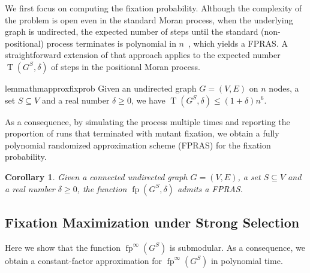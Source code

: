 \documentclass[letterpaper]{article}
\newtheorem{corollary}{Corollary}
\newcommand{\X}{\mathsf{X}}
\newcommand{\fp}{\operatorname{fp}}
\newcommand{\ft}{\operatorname{T}}
\newcommand{\FitAdv}{\delta}
\begin{document}
We first focus on computing the fixation probability.
Although the complexity of the problem is open even in the standard Moran process,
when the underlying graph is undirected, the expected number of steps until
the standard (non-positional) process terminates %
is polynomial in $n$~\cite{Diaz2014}, which yields a FPRAS.
A straightforward extension of that approach applies to the expected number $\ft(G^S,\FitAdv)$ of steps in the positional Moran process.
\begin{restatable}{lemma}{thmapproxfixprob}\label{thm:approx_fix_prob}
Given an undirected graph $G=(V,E)$ on $n$ nodes,
a set $S\subseteq V$ and a real number $\FitAdv\geq 0$,
we have $\ft(G^S,\FitAdv)\le (1+\FitAdv)n^6$.
\end{restatable}

As a consequence, by simulating the process multiple times and reporting the proportion of runs that terminated with mutant fixation, we obtain a fully polynomial randomized approximation scheme (FPRAS) for the fixation probability.

\begin{corollary}\label{cor:approx_fix_prob}
Given a connected undirected graph $G=(V,E)$, a set $S\subseteq V$ and a real number $\FitAdv\geq 0$,
the function $\fp(G^S,\FitAdv)$ admits a FPRAS.
\end{corollary}


\subsection{Fixation Maximization under Strong Selection}\label{subsec:positive_strong}

Here we show that the function $\fp^\infty(G^S)$ is submodular.
As a consequence, we obtain a constant-factor approximation for $\fp^\infty(G^S)$ in polynomial time.
\end{document}
